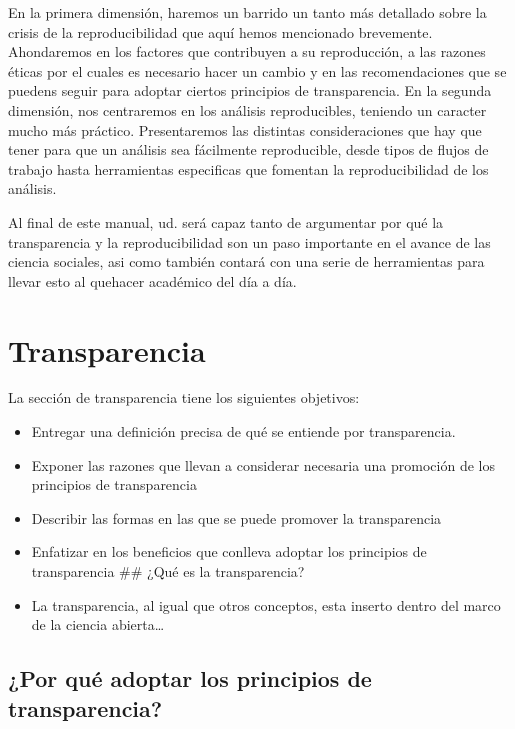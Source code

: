 \documentclass[
]{book}
\begin{document}
En la primera dimensión, haremos un barrido un tanto más detallado sobre la crisis de la reproducibilidad que aquí hemos mencionado brevemente. Ahondaremos en los factores que contribuyen a su reproducción, a las razones éticas por el cuales es necesario hacer un cambio y en las recomendaciones que se puedens seguir para adoptar ciertos principios de transparencia. En la segunda dimensión, nos centraremos en los análisis reproducibles, teniendo un caracter mucho más práctico. Presentaremos las distintas consideraciones que hay que tener para que un análisis sea fácilmente reproducible, desde tipos de flujos de trabajo hasta herramientas especificas que fomentan la reproducibilidad de los análisis.

Al final de este manual, ud. será capaz tanto de argumentar por qué la transparencia y la reproducibilidad son un paso importante en el avance de las ciencia sociales, asi como también contará con una serie de herramientas para llevar esto al quehacer académico del día a día.

\hypertarget{transparencia}{%
\chapter{Transparencia}\label{transparencia}}

La sección de transparencia tiene los siguientes objetivos:

\begin{itemize}
\item
  Entregar una definición precisa de qué se entiende por transparencia.
\item
  Exponer las razones que llevan a considerar necesaria una promoción de los principios de transparencia
\item
  Describir las formas en las que se puede promover la transparencia
\item
  Enfatizar en los beneficios que conlleva adoptar los principios de transparencia
  \#\# ¿Qué es la transparencia?
\item
  La transparencia, al igual que otros conceptos, esta inserto dentro del marco de la ciencia abierta\ldots{}
\end{itemize}

\hypertarget{por-quuxe9-adoptar-los-principios-de-transparencia}{%
\section{¿Por qué adoptar los principios de transparencia?}\label{por-quuxe9-adoptar-los-principios-de-transparencia}}
\end{document}
